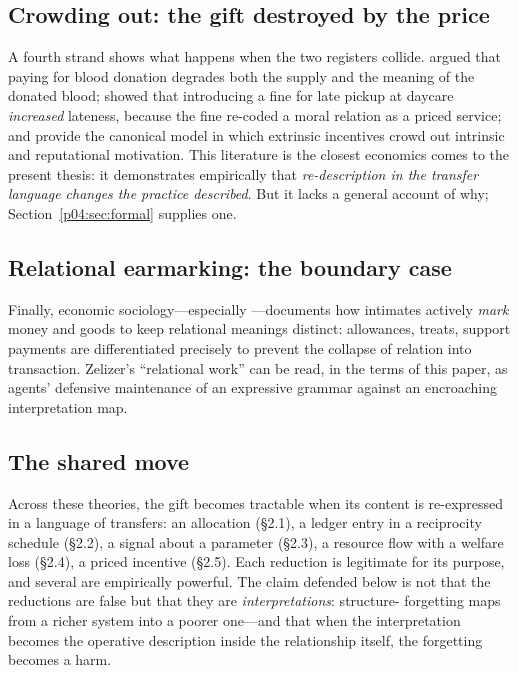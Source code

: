\subsection{Crowding out: the gift destroyed by the price}
A fourth strand shows what happens when the two registers collide.
\textcite{titmuss1970} argued that paying for blood donation degrades both the
supply and the meaning of the donated blood; \textcite{gneezy2000} showed that
introducing a fine for late pickup at daycare \emph{increased} lateness,
because the fine re-coded a moral relation as a priced service; and
\textcite{benabou2006} provide the canonical model in which extrinsic incentives
crowd out intrinsic and reputational motivation. This literature is the
closest economics comes to the present thesis: it demonstrates empirically
that \emph{re-description in the transfer language changes the practice
described}. But it lacks a general account of why; Section~\ref{p04:sec:formal}
supplies one.

\subsection{Relational earmarking: the boundary case}
Finally, economic sociology---especially \textcite{zelizer2005}---documents how
intimates actively \emph{mark} money and goods to keep relational meanings
distinct: allowances, treats, support payments are differentiated precisely
to prevent the collapse of relation into transaction. Zelizer's ``relational
work'' can be read, in the terms of this paper, as agents' defensive
maintenance of an expressive grammar against an encroaching interpretation
map.

\subsection{The shared move}
\label{p04:sec:sharedmove}
Across these theories, the gift becomes tractable when its content is
re-expressed in a language of transfers: an allocation
(\S2.1), a ledger entry in a reciprocity schedule (\S2.2), a signal
about a parameter (\S2.3), a resource flow with a welfare loss (\S2.4),
a priced incentive (\S2.5). Each reduction is legitimate for its purpose, and
several are empirically powerful. The claim defended below is not that the
reductions are false but that they are \emph{interpretations}: structure-
forgetting maps from a richer system into a poorer one---and that when the
interpretation becomes the operative description inside the relationship
itself, the forgetting becomes a harm.

